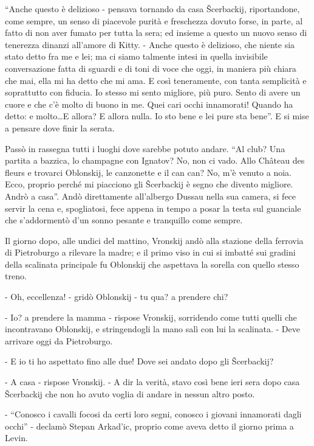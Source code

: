``Anche questo è delizioso - pensava tornando da casa Šcerbackij, riportandone, come sempre, un senso di piacevole purità e freschezza dovuto forse, in parte, al fatto di non aver fumato per tutta la sera; ed insieme a questo un nuovo senso di tenerezza dinanzi all'amore di Kitty. - Anche questo è delizioso, che niente sia stato detto fra me e lei; ma ci siamo talmente intesi in quella invisibile conversazione fatta di sguardi e di toni di voce che oggi, in maniera più chiara che mai, ella mi ha detto che mi ama. E così teneramente, con tanta semplicità e soprattutto con fiducia. Io stesso mi sento migliore, più puro. Sento di avere un cuore e che c'è molto di buono in me. Quei cari occhi innamorati! Quando ha detto: e molto\ldots{}E allora? E allora nulla. Io sto bene e lei pure sta bene''. E si mise a pensare dove finir la serata. 

Passò in rassegna tutti i luoghi dove sarebbe potuto andare. ``Al club? Una partita a bazzica, lo champagne con Ignatov? No, non ci vado. Allo Château des fleurs e trovarci Oblonskij, le canzonette e il can can? No, m'è venuto a noia. Ecco, proprio perché mi piacciono gli Šcerbackij è segno che divento migliore. Andrò a casa''. Andò direttamente all'albergo Dussau nella sua camera, si fece servir la cena e, spogliatosi, fece appena in tempo a posar la testa sul guanciale che s'addormentò d'un sonno pesante e tranquillo come sempre. 

\label{xvii} 

Il giorno dopo, alle undici del mattino, Vronskij andò alla stazione della ferrovia di Pietroburgo a rilevare la madre; e il primo viso in cui si imbatté sui gradini della scalinata principale fu Oblonskij che aspettava la sorella con quello stesso treno. 

- Oh, eccellenza! - gridò Oblonskij - tu qua? a prendere chi? 

- Io? a prendere la mamma - rispose Vronskij, sorridendo come tutti quelli che incontravano Oblonskij, e stringendogli la mano salì con lui la scalinata. - Deve arrivare oggi da Pietroburgo. 

- E io ti ho aspettato fino alle due! Dove sei andato dopo gli Šcerbackij? 

- A casa - rispose Vronskij. - A dir la verità, stavo così bene ieri sera dopo casa Šcerbackij che non ho avuto voglia di andare in nessun altro posto. 

- ``Conosco i cavalli focosi da certi loro segni, conosco i giovani innamorati dagli occhi'' - declamò Stepan Arkad'ic, proprio come aveva detto il giorno prima a Levin. 

